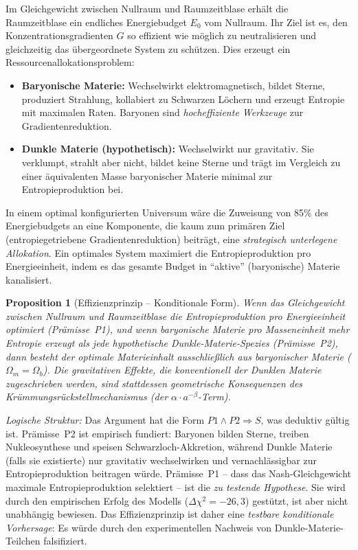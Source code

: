 \documentclass[aps,prd,twocolumn,superscriptaddress,nofootinbib]{revtex4-2}
\newtheorem{proposition}{Proposition}
\begin{document}
Im Gleichgewicht zwischen Nullraum und Raumzeitblase \cite{Geiger2026} erh\"alt die Raumzeitblase ein endliches Energiebudget $E_0$ vom Nullraum. Ihr Ziel ist es, den Konzentrationsgradienten $G$ so effizient wie m\"oglich zu neutralisieren und gleichzeitig das \"ubergeordnete System zu sch\"utzen. Dies erzeugt ein Ressourcenallokationsproblem:

\begin{itemize}
\item \textbf{Baryonische Materie:} Wechselwirkt elektromagnetisch, bildet Sterne, produziert Strahlung, kollabiert zu Schwarzen L\"ochern und erzeugt Entropie mit maximalen Raten. Baryonen sind \textit{hocheffiziente Werkzeuge} zur Gradientenreduktion.

\item \textbf{Dunkle Materie (hypothetisch):} Wechselwirkt nur gravitativ. Sie verklumpt, strahlt aber nicht, bildet keine Sterne und tr\"agt im Vergleich zu einer \"aquivalenten Masse baryonischer Materie minimal zur Entropieproduktion bei.
\end{itemize}

In einem optimal konfigurierten Universum w\"are die Zuweisung von 85\% des Energiebudgets an eine Komponente, die kaum zum prim\"aren Ziel (entropiegetriebene Gradientenreduktion) beitr\"agt, eine \textit{strategisch unterlegene Allokation}. Ein optimales System maximiert die Entropieproduktion pro Energieeinheit, indem es das gesamte Budget in "`aktive"' (baryonische) Materie kanalisiert.

\begin{proposition}[Effizienzprinzip -- Konditionale Form]
\textit{Wenn} das Gleichgewicht zwischen Nullraum und Raumzeitblase die Entropieproduktion pro Energieeinheit optimiert (Pr\"amisse~P1), und \textit{wenn} baryonische Materie pro Masseneinheit mehr Entropie erzeugt als jede hypothetische Dunkle-Materie-Spezies (Pr\"amisse~P2), \textit{dann} besteht der optimale Materieinhalt ausschlie\ss{}lich aus baryonischer Materie ($\Omega_m = \Omega_b$). Die gravitativen Effekte, die konventionell der Dunklen Materie zugeschrieben werden, sind stattdessen geometrische Konsequenzen des Kr\"ummungsr\"uckstellmechanismus (der $\alpha \cdot a^{-\beta}$-Term).
\end{proposition}

\textit{Logische Struktur:} Das Argument hat die Form $P1 \wedge P2 \Rightarrow S$, was deduktiv g\"ultig ist. Pr\"amisse~P2 ist empirisch fundiert: Baryonen bilden Sterne, treiben Nukleosynthese und speisen Schwarzloch-Akkretion, w\"ahrend Dunkle Materie (falls sie existierte) nur gravitativ wechselwirken und vernachl\"assigbar zur Entropieproduktion beitragen w\"urde. Pr\"amisse~P1 -- dass das Nash-Gleichgewicht maximale Entropieproduktion selektiert -- ist die \textit{zu testende Hypothese}. Sie wird durch den empirischen Erfolg des Modells ($\Delta\chi^2 = -26{,}3$) gest\"utzt, ist aber nicht unabh\"angig bewiesen. Das Effizienzprinzip ist daher eine \textit{testbare konditionale Vorhersage}: Es w\"urde durch den experimentellen Nachweis von Dunkle-Materie-Teilchen falsifiziert.
\end{document}
